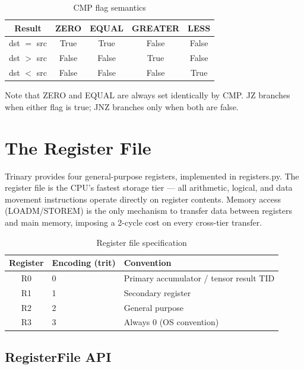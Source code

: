 \documentclass[12pt,a4paper,twoside]{book}
\theoremstyle{trinarytheorem}
\theoremstyle{trinarydefinition}
\newcommand{\code}[1]{\textsf{#1}}
\begin{document}
\begin{table}[H]
\centering
\caption{CMP flag semantics}
\label{tab:cmpflags}
\begin{tabular}{ccccc}
\toprule
Result & ZERO & EQUAL & GREATER & LESS \\
\midrule
dst $=$ src & True & True & False & False \\
dst $>$ src & False & False & True & False \\
dst $<$ src & False & False & False & True \\
\bottomrule
\end{tabular}
\end{table}

Note that ZERO and EQUAL are always set identically by CMP. JZ branches when either
flag is true; JNZ branches only when both are false.

\chapter{The Register File}
\label{ch:registers}

Trinary provides four general-purpose registers, implemented in \code{registers.py}.
The register file is the CPU's fastest storage tier --- all arithmetic, logical, and
data movement instructions operate directly on register contents. Memory access
(LOADM/STOREM) is the only mechanism to transfer data between registers and main
memory, imposing a 2-cycle cost on every cross-tier transfer.

\begin{table}[H]
\centering
\caption{Register file specification}
\label{tab:regs}
\begin{tabular}{cll}
\toprule
Register & Encoding (trit) & Convention \\
\midrule
R0 & 0 & Primary accumulator / tensor result TID \\
R1 & 1 & Secondary register \\
R2 & 2 & General purpose \\
R3 & 3 & Always 0 (OS convention) \\
\bottomrule
\end{tabular}
\end{table}

\section{RegisterFile API}
\end{document}
